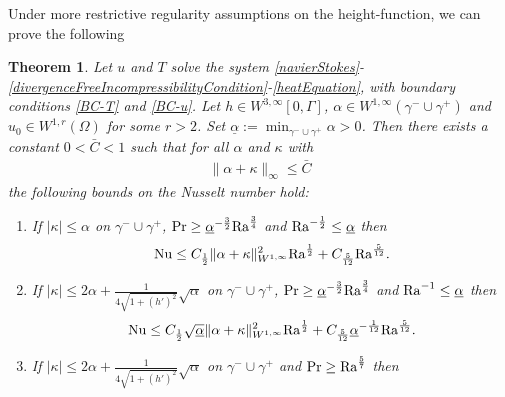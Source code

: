 \documentclass{article}
\newtheorem{theorem}{Theorem}[section]
\theoremstyle{definition}
\theoremstyle{definition}
\newcommand{\Pra}{\rm{Pr}}
\newcommand{\Ra}{{\rm{Ra}}}
\newcommand{\Nu}{{\rm{Nu}}}
\begin{document}
Under more restrictive regularity assumptions on the height-function, we can prove the following
\begin{theorem}
\label{main-theorem}
Let $u$ and $T$ solve the system \eqref{navierStokes}-\eqref{divergenceFreeIncompressibilityCondition}-\eqref{heatEquation}, with boundary conditions \eqref{BC-T} and \eqref{BC-u}.
Let $h\in W^{3,\infty}[0,\Gamma]$, $\alpha\in W^{1,\infty}(\gamma^-\cup\gamma^+)$ and $u_0\in W^{1,r}(\Omega)$ for some $r>2$. Set $\underline{\alpha}:=\min_{\gamma^-\cup\gamma^+}\alpha>0$. Then there exists a constant $0<\bar C<1$ such that for all $\alpha$ and $\kappa$ with
\begin{align}
    \label{theorem-condition-alpha+kappa-small}
    \|\alpha+\kappa\|_\infty \leq \bar C
\end{align}
the following bounds on the Nusselt number hold:
\begin{enumerate}
    \item\label{main-theorem-case-interpolation-kappa-leq-alpha}
        If $|\kappa|\leq \alpha$ on $\gamma^-\cup\gamma^+$, $\Pra\geq \underline{\alpha}^{-\frac{3}{2}}\Ra^\frac{3}{4}$ and $\Ra^{-\frac{1}{2}}\leq \underline{\alpha}$ then %
        \begin{align}
            \label{main-theorem-bound-interpolation-kappa-leq-alpha}
            \Nu \leq C_\frac{1}{2} \|\alpha+\kappa\|_{W^{1,\infty}}^2 \Ra^\frac{1}{2} + C_\frac{5}{12}\Ra^\frac{5}{12}.
        \end{align}
    \item\label{main-theorem-case-interpolation-more-general-kappa}
        If $|\kappa|\leq 2\alpha + \frac{1}{4\sqrt{1+(h')^2}}\sqrt{\alpha}$ on $\gamma^-\cup\gamma^+$, $\Pra\geq \underline{\alpha}^{-\frac{3}{2}}\Ra^\frac{3}{4}$ and $\Ra^{-1}\leq \underline{\alpha}$ then %
        \begin{align}
            \label{main-theorem-bound-interpolation-more-general-kappa}
            \Nu \leq C_\frac{1}{2} \sqrt{\underline{\alpha}}\|\alpha+\kappa\|_{W^{1,\infty}}^2 \Ra^\frac{1}{2} + C_\frac{5}{12} \underline{\alpha}^{-\frac{1}{12}} \Ra^\frac{5}{12}.
        \end{align}
    \item\label{main-theorem-case-3over7bound}
        If $|\kappa|\leq 2\alpha + \frac{1}{4\sqrt{1+(h')^2}}\sqrt{\alpha}$ on $\gamma^-\cup\gamma^+$ and $\Pra\geq \Ra^\frac{5}{7}$ then %
        \begin{align}
            \label{main-theorem-bound-3over7bound}

\end{align}
\end{enumerate}
\end{theorem}
\end{document}
